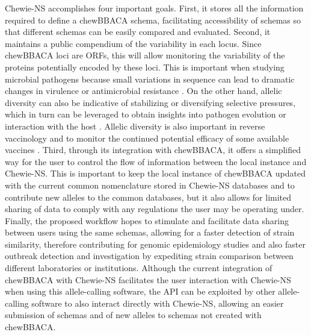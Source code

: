 \ac{Chewie-NS} accomplishes four important goals. First, it stores all the information required to define a chewBBACA schema, facilitating accessibility of schemas so that different schemas can be easily compared and evaluated. Second, it maintains a public compendium of the variability in each locus. Since chewBBACA loci are \ac{ORFs}, this will allow monitoring the variability of the proteins potentially encoded by these loci. This is important when studying microbial pathogens because small variations in sequence can lead to dramatic changes in virulence \cite{li_genome-wide_2019} or antimicrobial resistance \cite{van_der_linden_heterogeneity_2020}. On the other hand, allelic diversity can also be indicative of stabilizing or diversifying selective pressures, which in turn can be leveraged to obtain insights into pathogen evolution or interaction with the host \cite{yamaguchi_identification_2019}. Allelic diversity is also important in reverse vaccinology \cite{moxon_editorial_2019} and to monitor the continued potential efficacy of some available vaccines \cite{maiden_impact_2018}. Third, through its integration with chewBBACA, it offers a simplified way for the user to control the flow of information between the local instance and \ac{Chewie-NS}. This is important to keep the local instance of chewBBACA updated with the current common nomenclature stored in \ac{Chewie-NS} databases and to contribute new alleles to the common databases, but it also allows for limited sharing of data to comply with any regulations the user may be operating under. Finally, the proposed workflow hopes to stimulate and facilitate data sharing between users using the same schemas, allowing for a faster detection of strain similarity, therefore contributing for genomic epidemiology studies and also faster outbreak detection and investigation by expediting strain comparison between different laboratories or institutions. Although the current integration of chewBBACA with \ac{Chewie-NS} facilitates the user interaction with \ac{Chewie-NS} when using this allele-calling software, the \ac{API} can be exploited by other allele-calling software to also interact directly with \ac{Chewie-NS}, allowing an easier submission of schemas and of new alleles to schemas not created with chewBBACA. 

